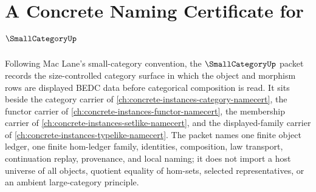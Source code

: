 \chapter{A Concrete Naming Certificate for $\SmallCategoryUp$}
\label{ch:concrete-instances-small-category-namecert}

Following Mac Lane's small-category convention, the $\SmallCategoryUp$ packet records the size-controlled category surface in which the object and morphism rows are displayed BEDC data before categorical composition is read. It sits beside the category carrier of \autoref{ch:concrete-instances-category-namecert}, the functor carrier of \autoref{ch:concrete-instances-functor-namecert}, the membership carrier of \autoref{ch:concrete-instances-setlike-namecert}, and the displayed-family carrier of \autoref{ch:concrete-instances-typelike-namecert}. The packet names one finite object ledger, one finite hom-ledger family, identities, composition, law transport, continuation replay, provenance, and local naming; it does not import a host universe of all objects, quotient equality of hom-sets, selected representatives, or an ambient large-category principle.

